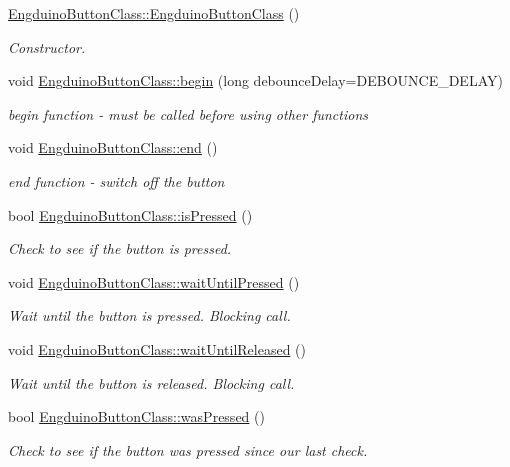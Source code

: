 \begin{DoxyCompactItemize}
\item 
\hyperlink{group___engduino_button_ga63fbf8689adcf68e546153e1cba62277}{Engduino\+Button\+Class\+::\+Engduino\+Button\+Class} ()
\begin{DoxyCompactList}\small\item\em Constructor. \end{DoxyCompactList}\item 
void \hyperlink{group___engduino_button_ga22235e73e3a5e2e4b0a8c12709b53ea5}{Engduino\+Button\+Class\+::begin} (long debounce\+Delay=D\+E\+B\+O\+U\+N\+C\+E\+\_\+\+D\+E\+L\+A\+Y)
\begin{DoxyCompactList}\small\item\em begin function -\/ must be called before using other functions \end{DoxyCompactList}\item 
void \hyperlink{group___engduino_button_gabd1ddb88707b93a8ebd1ad61c458073e}{Engduino\+Button\+Class\+::end} ()
\begin{DoxyCompactList}\small\item\em end function -\/ switch off the button \end{DoxyCompactList}\item 
bool \hyperlink{group___engduino_button_ga7b1d7a4d6a9602d549ad7d22fbe1d61b}{Engduino\+Button\+Class\+::is\+Pressed} ()
\begin{DoxyCompactList}\small\item\em Check to see if the button is pressed. \end{DoxyCompactList}\item 
void \hyperlink{group___engduino_button_gab7c5e25ca8c7b46bb5afb89349dc2764}{Engduino\+Button\+Class\+::wait\+Until\+Pressed} ()
\begin{DoxyCompactList}\small\item\em Wait until the button is pressed. Blocking call. \end{DoxyCompactList}\item 
void \hyperlink{group___engduino_button_ga6c073bb47b4514b4489092ff1d8d4191}{Engduino\+Button\+Class\+::wait\+Until\+Released} ()
\begin{DoxyCompactList}\small\item\em Wait until the button is released. Blocking call. \end{DoxyCompactList}\item 
bool \hyperlink{group___engduino_button_gaa7265d49dd122b3a0bf39b01f4219291}{Engduino\+Button\+Class\+::was\+Pressed} ()
\begin{DoxyCompactList}\small\item\em Check to see if the button was pressed since our last check. \end{DoxyCompactList}\item 

\end{DoxyCompactItemize}

